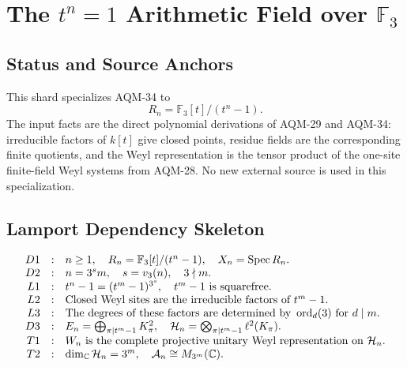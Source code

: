 
\section{The \texorpdfstring{\(t^n=1\)}{t to the n equals 1} Arithmetic Field over \texorpdfstring{\(\mathbb F_3\)}{F3}}
\label{sec:tn-equals-1-f3-arithmetic-field}

\subsection{Status and Source Anchors}

This shard specializes AQM-34 to
\[
  R_n=\mathbb F_3[t]/(t^n-1).
\]
The input facts are the direct polynomial derivations of AQM-29 and AQM-34:
irreducible factors of \(k[t]\) give closed points, residue fields are the
corresponding finite quotients, and the Weyl representation is the tensor
product of the one-site finite-field Weyl systems from AQM-28.  No new external
source is used in this specialization.

\subsection{Lamport Dependency Skeleton}

\[
\begin{array}{rcl}
D1&:&n\ge1,\quad R_n=\mathbb F_3[t]/(t^n-1),\quad X_n=\operatorname{Spec} R_n.\\
D2&:&n=3^s m,\quad s=v_3(n),\quad 3\nmid m.\\
L1&:&t^n-1=(t^m-1)^{3^s},\quad t^m-1\text{ is squarefree}.\\
L2&:&\text{Closed Weyl sites are the irreducible factors of }t^m-1.\\
L3&:&\text{The degrees of these factors are determined by }
      \operatorname{ord}_d(3)\text{ for }d\mid m.\\
D3&:&E_n=\bigoplus_{\pi\mid t^m-1}K_\pi^2,\quad
      \mathcal H_n=\bigotimes_{\pi\mid t^m-1}\ell^2(K_\pi).\\
T1&:&W_n\text{ is the complete projective unitary Weyl representation on }
      \mathcal H_n.\\
T2&:&\dim_{\mathbb C}\mathcal H_n=3^m,\quad
      \mathcal A_n\cong M_{3^m}(\mathbb C).
\end{array}
\]

